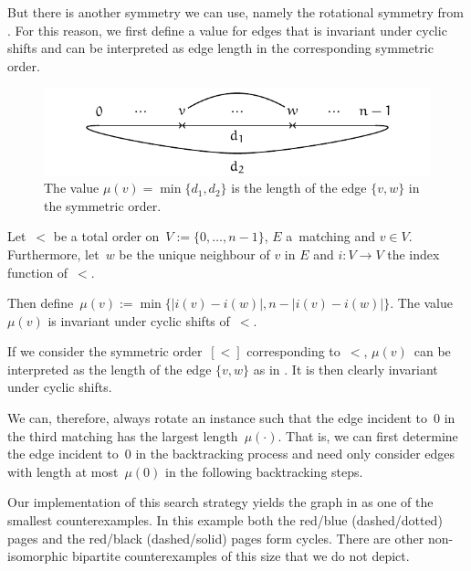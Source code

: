 But there is another symmetry we can use, namely the rotational symmetry from . For this reason, we first define a value for edges that is invariant under
cyclic shifts and can be interpreted as edge length in the corresponding symmetric order.

\begin{figure}[\placement]
    \centering
    \includegraphics{figures/t_bip_length}
    \caption[Cyclic length of an edge]{The value $\mu(v) = \min\{d_1, d_2\}$ is the length of the edge $\{v, w\}$ in the symmetric order.}
    \label{figure:bip_length}
\end{figure}
  
\begin{deflemma}
Let~$<$ be a total order on~$V := \{0, \dotsc, n-1\}$, $E$ a~matching and $v \in V$. Furthermore,
let~$w$ be the unique neighbour of $v$ in $E$ and $i: V \rightarrow V$ the index function of~$<$.

Then define~$\mu(v) := \min\bigl\{|i(v) - i(w)|, n - |i(v) - i(w)|\bigr\}$. The value~$\mu(v)$ is invariant
under cyclic shifts of~$<$.
\end{deflemma}
\begin{myproof}
If we consider the symmetric order~$[<]$ corresponding to~$<$, $\mu(v)$~can be interpreted as the length of
the edge $\{v, w\}$ as in . It is then clearly invariant 
under cyclic shifts.
\end{myproof}

We can, therefore, always rotate an instance such that the edge incident to~$0$ in the third
matching has the largest length~$\mu(\cdot)$. That is, we can first determine the edge incident to~$0$ in the backtracking
process and need only consider edges with length at most~$\mu(0)$ in the following backtracking steps.

Our implementation of this search strategy yields the graph in 
as one of the smallest counterexamples. In this example both the red/blue (dashed/dotted) pages
and the red/black (dashed/solid) pages form cycles.
There are other non-isomorphic bipartite counterexamples of this size that we do not depict.

